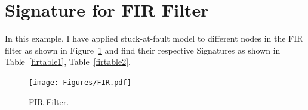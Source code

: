\section{Signature for FIR Filter}


In this example, I have applied stuck-at-fault model to different nodes in the FIR filter as shown in Figure~\ref{fig:filter} and find their respective Signatures as shown in Table~\ref{firtable1}, Table~\ref{firtable2}.
%
%
%
%
%
%
%
%
%
%



\begin{figure}[tb!]
 \centering
  \captionsetup{justification=centering}    
   \texttt{[image: Figures/FIR.pdf]}
   \caption{FIR Filter.}
\label{fig:filter}
\end{figure}





